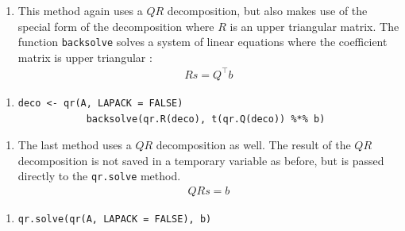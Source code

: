 \begin{enumerate}[resume*=quest]
	\item This method again uses a $QR$ decomposition, but also makes use of the special form of the decomposition where $R$ is an upper triangular matrix. The function \texttt{backsolve} solves a system of linear equations where the coefficient matrix is upper triangular \cite{R}:
	\begin{align*}
		Rs = Q^\top b
	\end{align*}
\end{enumerate}
\begin{enumerate}[resume*=inform]
	\item[] \begin{lstlisting}[otherkeywords={\%*\%, qr.R}, numbers=none]
			deco <- qr(A, LAPACK = FALSE)
			backsolve(qr.R(deco), t(qr.Q(deco)) %*% b)
			\end{lstlisting}
\end{enumerate}


\begin{enumerate}[resume*=quest]
	\item The last method uses a $QR$ decomposition as well. The result of the $QR$ decomposition is not saved in a temporary variable as before, but is passed directly to the \texttt{qr.solve} method. 	
	\begin{align*}
		QRs = b
	\end{align*}
\end{enumerate}
\begin{enumerate}[resume*=inform]
	\item[] \begin{lstlisting}[otherkeywords={\%*\%, qr.R}, numbers=none]
			qr.solve(qr(A, LAPACK = FALSE), b)
			\end{lstlisting}
\end{enumerate}

